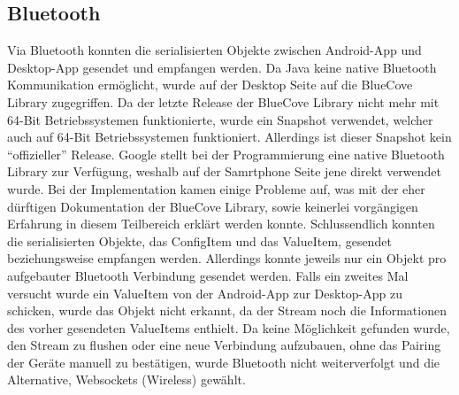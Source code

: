 \subsection{Bluetooth}
Via Bluetooth konnten die serialisierten Objekte zwischen Android-App 
und Desktop-App gesendet und empfangen werden. 
Da Java keine native Bluetooth Kommunikation ermöglicht, wurde auf der 
Desktop Seite auf die BlueCove Library zugegriffen. Da der letzte Release der 
BlueCove Library nicht mehr mit 64-Bit Betriebssystemen funktionierte, wurde ein Snapshot 
verwendet, welcher auch auf 64-Bit Betriebssystemen funktioniert. Allerdings ist dieser Snapshot 
kein \enquote{offizieller} Release.
Google stellt bei der Programmierung eine native Bluetooth 
Library zur Verfügung, weshalb auf der Samrtphone Seite jene direkt verwendet wurde. 
Bei der Implementation kamen einige Probleme auf, was mit der eher dürftigen 
Dokumentation der BlueCove Library, sowie keinerlei vorgängigen Erfahrung in diesem Teilbereich 
erklärt werden konnte. Schlussendlich konnten die serialisierten Objekte, das ConfigItem 
und das ValueItem, gesendet beziehungsweise empfangen werden.
Allerdings konnte jeweils nur ein Objekt pro aufgebauter 
Bluetooth Verbindung gesendet werden. Falls ein zweites Mal versucht wurde ein ValueItem von der 
Android-App zur Desktop-App zu schicken, wurde das Objekt nicht erkannt, da der 
Stream noch die Informationen des vorher gesendeten ValueItems enthielt. 
Da keine Möglichkeit gefunden wurde, den Stream zu flushen oder eine neue 
Verbindung aufzubauen, ohne das Pairing der Geräte manuell zu bestätigen, wurde Bluetooth 
nicht weiterverfolgt und die Alternative, Websockets (Wireless) gewählt. 

            
